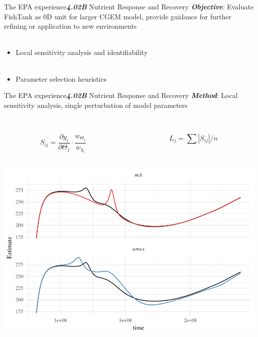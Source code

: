 \documentclass[serif]{beamer}\usepackage[]{graphicx}\usepackage[]{color}
\makeatletter
\def\maxwidth{ %
  \ifdim\Gin@nat@width>\linewidth
    \linewidth
  \else
    \Gin@nat@width
  \fi
}
\newcommand{\emtxt}[1]{\textbf{\textit{#1}}}
\makeatother
\begin{document}
\begin{frame}{The EPA experience}{\emtxt{4.02B} Nutrient Response and Recovery}
\emtxt{Objective}: Evaluate FishTank as 0D unit for larger CGEM model, provide guidance for further refining or application to new environments \\~\\
\begin{itemize}
\item Local sensitivity analysis and identifiability \\~\\
\item Parameter selection heuristics
\end{itemize}
\end{frame}

\begin{frame}{The EPA experience}{\emtxt{4.02B} Nutrient Response and Recovery}
\emtxt{Method}: Local sensitivity analysis, single perturbation of model parameters \cite{Soetaert10} \\~\\
\begin{columns}
\begin{column}{0.5\textwidth}
\begin{equation*}
S_{ij} = \frac{\partial y_i}{\partial \Theta_j}\cdot\frac{w_{\Theta_j}}{w_{y_i}}
\end{equation*}
\end{column}
\begin{column}{0.5\textwidth}
\begin{equation*}
L_j = \sum|S_{ij}|/n
\end{equation*}
\end{column}
\end{columns}
\begin{columns}
\begin{column}{0.5\textwidth}


{\centering \includegraphics[width=\maxwidth]{fig/unnamed-chunk-2-1} 

}
\end{column}
\end{columns}
\end{frame}
\end{document}
